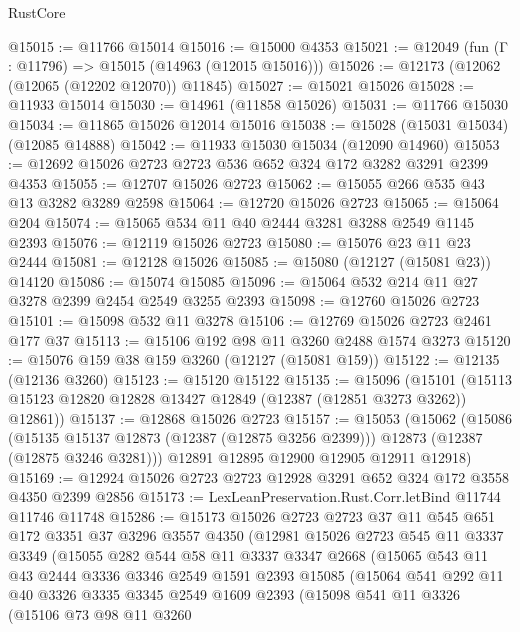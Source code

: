\begin{lexlean}{RustCore}
\begin{coremodule}
@15015 := @11766 @15014
@15016 := @15000 @4353
@15021 := @12049 (fun (Γ : @11796) => @15015 (@14963 (@12015 @15016)))
@15026 := @12173 (@12062 (@12065 (@12202 @12070)) @11845)
@15027 := @15021 @15026
@15028 := @11933 @15014
@15030 := @14961 (@11858 @15026)
@15031 := @11766 @15030
@15034 := @11865 @15026 @12014 @15016
@15038 := @15028 (@15031 @15034) (@12085 @14888)
@15042 := @11933 @15030 @15034 (@12090 @14960)
@15053 := @12692 @15026 @2723 @2723 @536 @652 @324 @172 @3282 @3291 @2399 @4353
@15055 := @12707 @15026 @2723
@15062 := @15055 @266 @535 @43 @13 @3282 @3289 @2598
@15064 := @12720 @15026 @2723
@15065 := @15064 @204
@15074 := @15065 @534 @11 @40 @2444 @3281 @3288 @2549 @1145 @2393
@15076 := @12119 @15026 @2723
@15080 := @15076 @23 @11 @23 @2444
@15081 := @12128 @15026
@15085 := @15080 (@12127 (@15081 @23)) @14120
@15086 := @15074 @15085
@15096 := @15064 @532 @214 @11 @27 @3278 @2399 @2454 @2549 @3255 @2393
@15098 := @12760 @15026 @2723
@15101 := @15098 @532 @11 @3278
@15106 := @12769 @15026 @2723 @2461 @177 @37
@15113 := @15106 @192 @98 @11 @3260 @2488 @1574 @3273
@15120 := @15076 @159 @38 @159 @3260 (@12127 (@15081 @159))
@15122 := @12135 (@12136 @3260)
@15123 := @15120 @15122
@15135 := @15096
    (@15101 (@15113 @15123 @12820 @12828 @13427 @12849 (@12387 (@12851 @3273 @3262)) @12861))
@15137 := @12868 @15026 @2723
@15157 := @15053
    (@15062
      (@15086
        (@15135 @15137 @12873 (@12387 (@12875 @3256 @2399)))
        @12873
        (@12387 (@12875 @3246 @3281)))
      @12891
      @12895
      @12900
      @12905
      @12911
      @12918)
@15169 := @12924 @15026 @2723 @2723 @12928 @3291 @652 @324 @172 @3558 @4350 @2399 @2856
@15173 := LexLeanPreservation.Rust.Corr.letBind @11744 @11746 @11748
@15286 := @15173
    @15026
    @2723
    @2723
    @37
    @11
    @545
    @651
    @172
    @3351
    @37
    @3296
    @3557
    @4350
    (@12981
      @15026
      @2723
      @545
      @11
      @3337
      @3349
      (@15055
        @282
        @544
        @58
        @11
        @3337
        @3347
        @2668
        (@15065
          @543
          @11
          @43
          @2444
          @3336
          @3346
          @2549
          @1591
          @2393
          @15085
          (@15064
            @541
            @292
            @11
            @40
            @3326
            @3335
            @3345
            @2549
            @1609
            @2393
            (@15098
              @541
              @11
              @3326
              (@15106
                @73
                @98
                @11
                @3260

\end{coremodule}
\end{lexlean}
